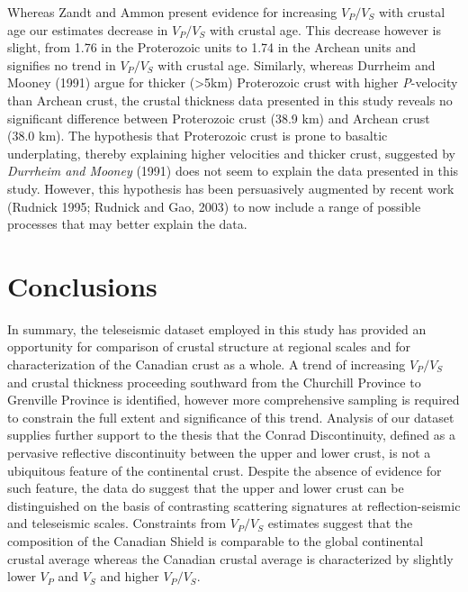 \documentclass[msc,oneside]{ubcthesis}
\begin{document}
Whereas Zandt and Ammon present evidence for increasing $V_P/V_S$ with crustal age our estimates decrease in $V_P/V_S$ with crustal age. This decrease however is slight, from 1.76 in the Proterozoic units to 1.74 in the Archean units and signifies no trend in $V_P/V_S$ with crustal age. Similarly, whereas Durrheim and Mooney (1991) argue for thicker (>5km) Proterozoic crust with higher {\it P}-velocity than Archean crust, the crustal thickness data presented in this study reveals no significant difference between Proterozoic crust (38.9 km) and Archean crust (38.0 km). The hypothesis that Proterozoic crust is prone to basaltic underplating, thereby explaining higher velocities and thicker crust, suggested by {\it Durrheim and Mooney} (1991) does not seem to explain the data presented in this study. However, this hypothesis has been persuasively augmented by recent work (Rudnick 1995; Rudnick and Gao, 2003) to now include a range of possible processes that may better explain the data.


\chapter{Conclusions}

In summary, the teleseismic dataset employed in this study has provided an opportunity for comparison of crustal structure at regional scales and for characterization of the Canadian crust as a whole. A trend of increasing $V_P/V_S$ and crustal thickness proceeding southward from the Churchill Province to Grenville Province is identified, however more comprehensive sampling is required to constrain the full extent and significance of this trend. Analysis of our dataset supplies further support to the thesis that the Conrad Discontinuity, defined as a pervasive reflective discontinuity between the upper and lower crust, is not a ubiquitous feature of the continental crust. Despite the absence of evidence for such feature, the data do suggest that the upper and lower crust can be distinguished on the basis of contrasting scattering signatures at reflection-seismic and teleseismic scales. Constraints from $V_P/V_S$ estimates suggest that the composition of the Canadian Shield is comparable to the global continental crustal average whereas the Canadian crustal average is characterized by slightly lower $V_P$ and $V_S$ and higher $V_P/V_S$.
\end{document}
